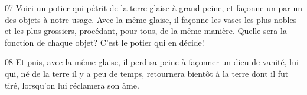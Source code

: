 
07 Voici un potier qui pétrit de la terre glaise à grand-peine, et façonne un par un des objets à notre usage. Avec la même glaise, il façonne les vases les plus nobles et les plus grossiers, procédant, pour tous, de la même manière. Quelle sera la fonction de chaque objet? C’est le potier qui en décide!

08 Et puis, avec la même glaise, il perd sa peine à façonner un dieu de vanité, lui qui, né de la terre il y a peu de temps, retournera bientôt à la terre dont il fut tiré, lorsqu’on lui réclamera son âme.